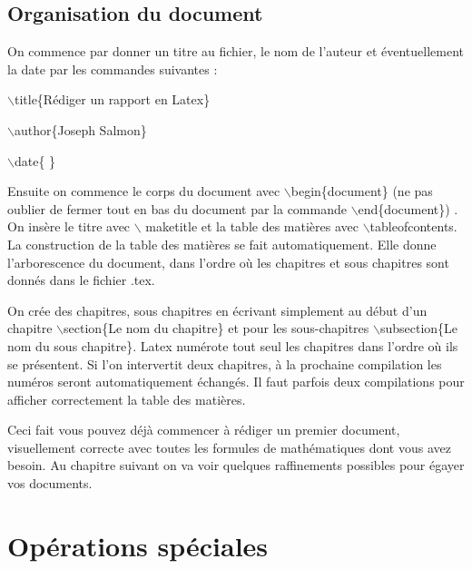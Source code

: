 \documentclass[11pt]{article}
\theoremstyle{remark}
\theoremstyle{definition}
\begin{document}


\subsection{Organisation du document}
On commence par donner un titre au  fichier, le nom de l'auteur et éventuellement la date par les commandes suivantes :\medskip

$\backslash$title\{Rédiger un rapport en Latex\}

$\backslash$author\{Joseph Salmon\}

$\backslash$date\{ \} \medskip


Ensuite on commence le corps du document avec $\backslash$begin\{document\} (ne pas oublier de fermer tout en bas du document par la commande $\backslash$end\{document\}) . On insère le titre avec $\backslash$ maketitle et la table des matières avec $\backslash$tableofcontents. La construction de la table des matières se fait automatiquement. Elle donne l'arborescence du document, dans l'ordre où les chapitres et sous chapitres sont donnés dans le fichier .tex.\medskip


On crée  des chapitres, sous chapitres en écrivant simplement  au début d'un chapitre $\backslash$section\{Le nom du chapitre\} et pour les sous-chapitres $\backslash$subsection\{Le nom du sous chapitre\}.  Latex numérote tout seul les chapitres dans l'ordre où ils se présentent. Si l'on intervertit deux chapitres, à la prochaine compilation les numéros seront automatiquement échangés. Il faut parfois deux compilations pour afficher correctement la table des matières.  \medskip

Ceci fait vous pouvez déjà commencer à rédiger un premier document, visuellement correcte avec toutes les formules de mathématiques dont vous avez besoin. Au chapitre suivant on va voir quelques raffinements possibles pour égayer vos documents.


\section{Opérations spéciales}
\end{document}

